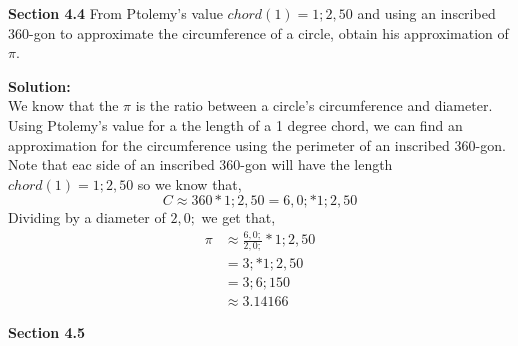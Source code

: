 \documentclass[12pt]{article}
\makeatletter
\theoremstyle{homework}
\newenvironment{exercise}[1]
{\def\@currentlabel{#1}\exercisecore}
{\endexercisecore}
\newcommand{\localhead}[1]{\par\smallskip\noindent\textbf{#1}\nobreak\\}%
\newcommand\solution{\localhead{Solution:}}
\makeatother
\begin{document}
\textbf{Section 4.4}
\begin{exercise}{4b}
\end{exercise} From Ptolemy's value $chord(1) = 1;2,50$ and using an inscribed 360-gon to approximate 
the circumference of a circle, obtain his approximation of $\pi$.\\
\solution We know that the $\pi$ is the ratio between a circle's circumference and diameter. Using Ptolemy's
value for a the length of a 1 degree chord, we can find an approximation for the circumference using the perimeter of an inscribed 
360-gon. Note that eac side of an inscribed 360-gon will have the length $chord(1) = 1;2,50$ so we know that,
\begin{equation*}
  C \approx 360 * 1;2,50 = 6,0; * 1;2,50
\end{equation*}
Dividing by a diameter of $2,0;$ we get that, 
\begin{align*}
 \pi &\approx \frac{6,0;}{2,0;} * 1;2,50\\
 &= 3; * 1;2,50\\
   &= 3;6;150 \\
   &\approx 3.14166
\end{align*}
\vspace{.5in}




\textbf{Section 4.5}
\end{document}
